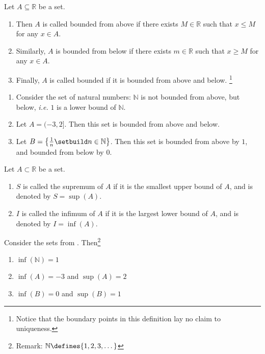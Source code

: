 \begin{definition}\label{def-bounded-sets}
	Let $A \subseteq\mathbb{R}$ be a set.
	\begin{enumerate}
		\item Then $A$ is called bounded from above if there exists $M\in\mathbb{R}$
		      such that $x\leq M$ for any $x\in A$.
		\item Similarly, $A$ is bounded from below if there exists $m\in\mathbb{R}$
		      such that $x\geq M$ for any $x\in A$.
		\item Finally, $A$ is called bounded if it is bounded from above and below.
		      \footnote{Notice that the boundary points in this definition
			      lay no claim to uniqueness.}
	\end{enumerate}
\end{definition}

\begin{exm}\label{exm-bounded-sets:1}
	\hfill
	\begin{enumerate}
		\item Consider the set of natural numbers: $\mathbb{N}$ is not bounded from above, but
		      below, \textit{i.e.} $1$ is a lower bound of $\mathbb{N}$.
		\item Let $A=(-3,2]$. Then this set is bounded from above and below.
		\item Let $B=\left\{\frac{1}{n}\setbuild n\in\mathbb{N}\right\}$. Then this
		      set is bounded from above by $1$, and bounded from below by $0$.
	\end{enumerate}
\end{exm}

\begin{definition}\label{def-supremum-infimum-sets}
	Let $A\subset\mathbb{R}$ be a set.
	\begin{enumerate}
		\item $S$ is called the supremum of $A$ if it is the smallest upper bound
		      of $A$, and is denoted by $S=\sup(A)$.
		\item $I$ is called the infimum of $A$ if it is the largest lower bound
		      of $A$, and is denoted by $I=\inf(A)$.
	\end{enumerate}
\end{definition}

\begin{exm}\label{exm-bounded-sets:2}
	Consider the sets from . Then\footnote{Remark:
		$\mathbb{N}\defines\{1,2,3,\dots\}$}
	\begin{enumerate}
		\item $\inf(\mathbb{N})=1$
		\item $\inf(A)=-3$ and $\sup(A)=2$
		\item $\inf(B)=0$ and $\sup(B)=1$
	\end{enumerate}
\end{exm}

